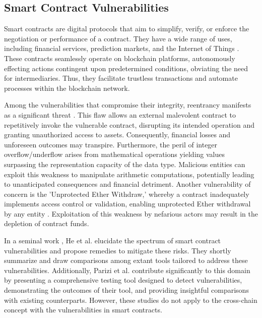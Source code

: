\documentclass[sigconf]{acmart}
\begin{document}
\subsection{Smart Contract Vulnerabilities}
Smart contracts are digital protocols that aim to simplify, verify, or enforce the negotiation or performance of a contract. They have a wide range of uses, including financial services, prediction markets, and the Internet of Things \cite{wang2018overview}. These contracts seamlessly operate on blockchain platforms, autonomously effecting actions contingent upon predetermined conditions, obviating the need for intermediaries. Thus, they facilitate trustless transactions and automate processes within the blockchain network. 

Among the vulnerabilities that compromise their integrity, reentrancy manifests as a significant threat \cite{zhang2022cbgru}. This flaw allows an external malevolent contract to repetitively invoke the vulnerable contract, disrupting its intended operation and granting unauthorized access to assets. Consequently, financial losses and unforeseen outcomes may transpire. Furthermore, the peril of integer overflow/underflow arises from mathematical operations yielding values surpassing the representation capacity of the data type. Malicious entities can exploit this weakness to manipulate arithmetic computations, potentially leading to unanticipated consequences and financial detriment\cite{lai2020static}. Another vulnerability of concern is the 'Unprotected Ether Withdraw,' whereby a contract inadequately implements access control or validation, enabling unprotected Ether withdrawal by any entity \cite{staderini2020classification}. Exploitation of this weakness by nefarious actors may result in the depletion of contract funds.

In a seminal work \cite{he2020smart}, He et al. elucidate the spectrum of smart contract vulnerabilities and propose remedies to mitigate these risks. They shortly summarize and draw comparisons among extant tools tailored to address these vulnerabilities. Additionally, Parizi et al. \cite{parizi2018empirical} contribute significantly to this domain by presenting a comprehensive testing tool designed to detect vulnerabilities, demonstrating the outcomes of their tool, and providing insightful comparisons with existing counterparts. However, these studies do not apply to the cross-chain concept with the vulnerabilities in smart contracts.
\end{document}
